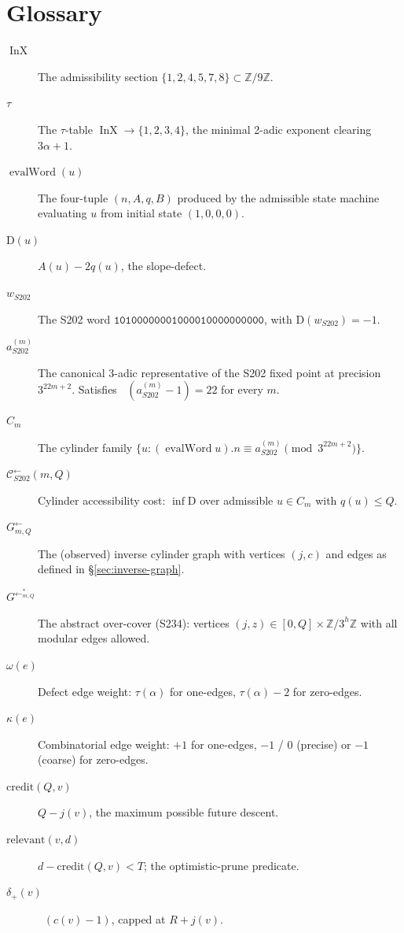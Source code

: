 \documentclass[11pt,a4paper]{article}
\theoremstyle{plain}
\theoremstyle{definition}
\newcommand{\ZZ}{\mathbb{Z}}
\newcommand{\aSat}{a_{S202}^{(m)}}
\newcommand{\wS}{w_{S202}}
\newcommand{\defect}{\mathrm{D}}
\newcommand{\credit}{\mathrm{credit}}
\newcommand{\relevant}{\mathrm{relevant}}
\newcommand{\Cback}{\mathcal{C}^{\!\leftarrow}_{S202}}
\newcommand{\InvG}{G^{\!\leftarrow}}
\DeclareMathOperator{\InX}{InX}
\DeclareMathOperator{\evalWord}{evalWord}
\DeclareMathOperator{\nuthree}{\nu_3}
\begin{document}
\section{Glossary}\label{app:glossary}

\begin{description}
  \item[$\InX$] The admissibility section
        $\{1, 2, 4, 5, 7, 8\} \subset \ZZ/9\ZZ$.
  \item[$\tau$] The $\tau$-table $\InX \to \{1, 2, 3, 4\}$, the
        minimal 2-adic exponent clearing $3\alpha + 1$.
  \item[$\evalWord(u)$] The four-tuple $(n, A, q, B)$ produced by
        the admissible state machine evaluating $u$ from initial
        state $(1, 0, 0, 0)$.
  \item[$\defect(u)$] $A(u) - 2 q(u)$, the slope-defect.
  \item[$\wS$] The S202 word
        $\mathtt{10100000001000010000000000}$, with
        $\defect(\wS) = -1$.
  \item[$\aSat$] The canonical 3-adic representative of the
        S202 fixed point at precision $3^{22m + 2}$.
        Satisfies $\nuthree(\aSat - 1) = 22$ for every $m$.
  \item[$C_m$] The cylinder family
        $\{u : (\evalWord u).n \equiv \aSat \pmod{3^{22m+2}}\}$.
  \item[$\Cback(m, Q)$] Cylinder accessibility cost:
        $\inf \defect$ over admissible $u \in C_m$ with
        $q(u) \le Q$.
  \item[$\InvG_{m, Q}$] The (observed) inverse cylinder graph
        with vertices $(j, c)$ and edges as defined in
        \S\ref{sec:inverse-graph}.
  \item[$\InvG^{*}_{m, Q}$] The abstract over-cover (S234):
        vertices $(j, z) \in [0, Q] \times \ZZ/3^h\ZZ$ with
        all modular edges allowed.
  \item[$\omega(e)$] Defect edge weight: $\tau(\alpha)$ for
        one-edges, $\tau(\alpha) - 2$ for zero-edges.
  \item[$\kappa(e)$] Combinatorial edge weight: $+1$ for
        one-edges, $-1$ / $0$ (precise) or $-1$ (coarse) for
        zero-edges.
  \item[$\credit(Q, v)$] $Q - j(v)$, the maximum possible
        future descent.
  \item[$\relevant(v, d)$] $d - \credit(Q, v) < T$; the
        optimistic-prune predicate.
  \item[$\delta_+(v)$] $\nuthree(c(v) - 1)$, capped at $R + j(v)$.

\end{description}
\end{document}
